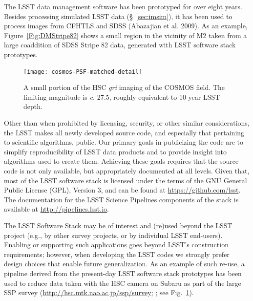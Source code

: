The LSST data management software has been prototyped for over eight
years. Besides processing simulated LSST data
(\S~\ref{sec:imsim}), it has been used to process images from CFHTLS
and SDSS (Abazajian et al. 2009). As an example,
Figure~\ref{Fig:DMStripe82} shows a small region in the vicinity of M2
taken from a large coaddition of SDSS Stripe 82 data, generated with LSST
software stack prototypes.
\\

\begin{figure}
\texttt{[image: cosmos-PSF-matched-detail]}
\caption{
  A small portion of the HSC \textit{gri} imaging of the COSMOS field.  The limiting magnitude is
  \textit{c.} 27.5, roughly equivalent to 10-year LSST depth.
  }
\label{Fig:HSC_cosmos}
\end{figure}

Other than when prohibited by licensing, security, or other similar
considerations, the LSST makes all newly developed source code, and especially
that pertaining to scientific algorithms, public.  Our primary goals in
publicizing the code are to simplify reproducibility of LSST data products
and to provide insight into algorithms used to create them.  Achieving these goals requires
that the source code is not only available, but appropriately documented at all
levels.
Given that, most of the LSST software stack is licensed under the terms of the GNU General
Public License (GPL), Version 3, and can be found at \url{https://github.com/lsst}.
The documentation for the LSST Science Pipelines components of the stack is available at
\url{http://pipelines.lsst.io}.

The LSST Software Stack may be of interest and (re)used beyond the LSST project (e.g.,
by other survey projects, or by individual LSST end-users).  Enabling
or supporting such applications goes beyond LSST’s construction
requirements; however, when developing the LSST codes we strongly
prefer design choices that enable future generalization.  As an example of such
re-use, a pipeline derived from the present-day LSST software stack prototypes
has been used to reduce data taken with the HSC camera on
Subaru as part of the large SSP survey (\url{http://hsc.mtk.nao.ac.jp/ssp/survey};
\cite{2017arXiv170405858A,2017arXiv170506766B}; see Fig.~\ref{Fig:HSC_cosmos}).


